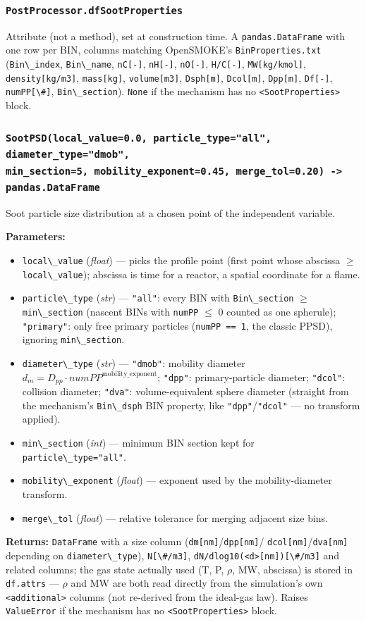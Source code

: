 \documentclass[11pt,a4paper]{report}
\newcommand{\pymethod}[1]{\subsubsection{\texttt{#1}}}
\newcommand{\returns}{\vspace{2mm}\noindent\textbf{Returns:} }
\newenvironment{params}{\vspace{1mm}\noindent\textbf{Parameters:}\begin{itemize}[leftmargin=1.1cm,label={--},itemsep=1pt,topsep=2pt]}{\end{itemize}}
\newcommand{\pkg}[1]{\lstinline|#1|}
\begin{document}
\pymethod{PostProcessor.dfSootProperties}

Attribute (not a method), set at construction time. A \pkg{pandas.DataFrame}
with one row per BIN, columns matching OpenSMOKE's \pkg{BinProperties.txt}
(\pkg{Bin\_index}, \pkg{Bin\_name}, \pkg{nC[-]}, \pkg{nH[-]}, \pkg{nO[-]},
\pkg{H/C[-]}, \pkg{MW[kg/kmol]}, \pkg{density[kg/m3]}, \pkg{mass[kg]},
\pkg{volume[m3]}, \pkg{Dsph[m]}, \pkg{Dcol[m]}, \pkg{Dpp[m]}, \pkg{Df[-]},
\pkg{numPP[\#]}, \pkg{Bin\_section}). \pkg{None} if the mechanism has no
\pkg{<SootProperties>} block.

\pymethod{SootPSD(local\_value=0.0, particle\_type="all", diameter\_type="dmob", \\ min\_section=5, mobility\_exponent=0.45, merge\_tol=0.20) -> pandas.DataFrame}

Soot particle size distribution at a chosen point of the independent
variable.

\begin{params}
\item \pkg{local\_value} (\textit{float}) --- picks the profile point (first
  point whose abscissa $\geq$ \pkg{local\_value}); abscissa is time for a
  reactor, a spatial coordinate for a flame.
\item \pkg{particle\_type} (\textit{str}) --- \pkg{"all"}: every BIN with
  \pkg{Bin\_section} $\geq$ \pkg{min\_section} (nascent BINs with
  \pkg{numPP} $\leq$ 0 counted as one spherule); \pkg{"primary"}: only free
  primary particles (\pkg{numPP == 1}, the classic PPSD), ignoring
  \pkg{min\_section}.
\item \pkg{diameter\_type} (\textit{str}) --- \pkg{"dmob"}: mobility
  diameter $d_m = D_{pp}\cdot numPP^{\text{mobility\_exponent}}$;
  \pkg{"dpp"}: primary-particle diameter; \pkg{"dcol"}: collision diameter;
  \pkg{"dva"}: volume-equivalent sphere diameter (straight from the
  mechanism's \pkg{Bin\_dsph} BIN property, like \pkg{"dpp"}/\pkg{"dcol"}
  --- no transform applied).
\item \pkg{min\_section} (\textit{int}) --- minimum BIN section kept for
  \pkg{particle\_type="all"}.
\item \pkg{mobility\_exponent} (\textit{float}) --- exponent used by the
  mobility-diameter transform.
\item \pkg{merge\_tol} (\textit{float}) --- relative tolerance for merging
  adjacent size bins.
\end{params}
\returns \pkg{DataFrame} with a size column (\pkg{dm[nm]}/\pkg{dpp[nm]}/
\pkg{dcol[nm]}/\pkg{dva[nm]} depending on \pkg{diameter\_type}), \pkg{N[\#/m3]},
\pkg{dN/dlog10(<d>[nm])[\#/m3]} and related columns; the gas state actually
used (T, P, $\rho$, MW, abscissa) is stored in \pkg{df.attrs} --- $\rho$ and
MW are both read directly from the simulation's own \pkg{<additional>}
columns (not re-derived from the ideal-gas law). Raises \pkg{ValueError} if
the mechanism has no \pkg{<SootProperties>} block.
\end{document}
